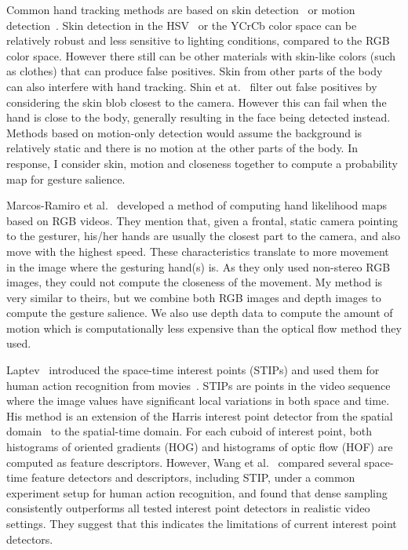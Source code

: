 Common hand tracking methods are based on skin detection~\cite{shin04} or
motion detection~\cite{cutler98}.
Skin detection in the HSV~\cite{bradski98} or the YCrCb color space can be
relatively robust and less sensitive to lighting conditions, compared to the RGB
color space. However there still can be other materials with skin-like colors (such as clothes) that can produce false positives. Skin from other parts of the body can also interfere with hand tracking. 
Shin et at.~\cite{shin04} filter out false positives by considering the skin blob closest to the camera. However this can fail when the hand is close to
the body, generally resulting in the face being detected instead. Methods based on motion-only detection would assume the background is relatively static and there is no motion at
the other parts of the body. In response, I consider skin, motion and closeness
together to compute a probability map for gesture salience.

Marcos-Ramiro et al.~\cite{marcos2013} developed a method of computing hand likelihood maps based on RGB videos. They mention that, given a frontal, static camera pointing to the gesturer,  his/her hands are usually the closest
part to the camera, and also move with the highest speed. These characteristics translate to more movement in the image where
the gesturing hand(s) is. As they only used non-stereo RGB images, they could
not compute the closeness of the movement.
My method is very similar to theirs, but we combine both RGB images and depth
 images to compute the gesture salience. We also use depth data to compute the
 amount of motion which is computationally less expensive than the optical flow
 method they used.

Laptev~\cite{laptev03} introduced the space-time interest points (STIPs) and used them for human
action recognition from movies~\cite{laptev08}. STIPs are points in the video sequence where the image values have
significant local variations in both space and time. His method is an extension of the Harris interest point detector from the spatial domain~\cite{Harris88}
to the spatial-time domain. For each cuboid of interest point, both histograms of oriented gradients (HOG)
and histograms of optic flow (HOF) are computed as feature descriptors. However,
Wang et al.~\cite{wang-spatio-09} compared several space-time feature detectors
and descriptors, including STIP, under a common experiment setup for human
action recognition, and found that dense sampling consistently outperforms all
tested interest point detectors in realistic video settings. They suggest that
this indicates the limitations of current interest point detectors.

